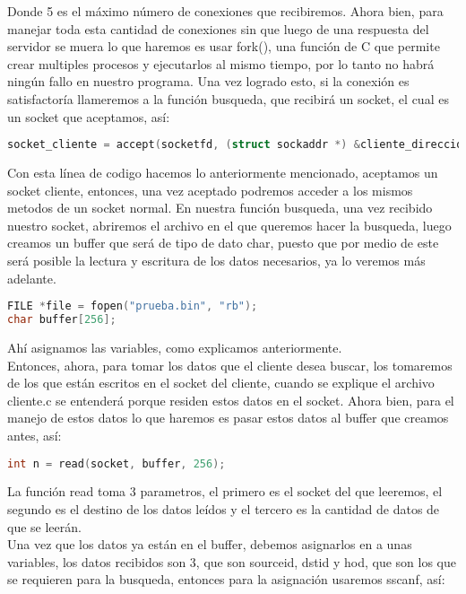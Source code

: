 \documentclass{article}
\begin{document}
Donde 5 es el máximo número de conexiones que recibiremos.
Ahora bien, para manejar toda esta cantidad de conexiones sin que luego de una respuesta del servidor se muera lo que haremos es usar fork()\cite{man7fork}, una función de C que permite crear multiples procesos y ejecutarlos al mismo tiempo, por lo tanto no habrá ningún fallo en nuestro programa.
Una vez logrado esto, si la conexión es satisfactoría llameremos a la función busqueda, que recibirá un socket, el cual es un socket que aceptamos, así:
\begin{lstlisting}[language=C]
socket_cliente = accept(socketfd, (struct sockaddr *) &cliente_direccion, &tamano_cliente);
\end{lstlisting}
Con esta línea de codigo hacemos lo anteriormente mencionado, aceptamos\cite{man7accept} un socket cliente, entonces, una vez aceptado podremos acceder a los mismos metodos de un socket normal.
En nuestra función busqueda, una vez recibido nuestro socket, abriremos el archivo en el que queremos hacer la busqueda, luego creamos un buffer que será de tipo de dato char, puesto que por medio de este será posible la lectura y escritura de los datos necesarios, ya lo veremos más adelante.


\begin{lstlisting}[language=C]
FILE *file = fopen("prueba.bin", "rb");
char buffer[256];
\end{lstlisting}


Ahí asignamos las variables, como explicamos anteriormente.\\ 
Entonces, ahora, para tomar los datos que el cliente desea buscar, los tomaremos de los que están escritos en el socket del cliente, cuando se explique el archivo cliente.c se entenderá porque residen estos datos en el socket. Ahora bien, para el manejo de estos datos lo que haremos es pasar estos datos al buffer que creamos antes, así:


\begin{lstlisting}[language=C]
int n = read(socket, buffer, 256);
\end{lstlisting}

La función read\cite{man7read} toma 3 parametros, el primero es el socket del que leeremos, el segundo es el destino de los datos leídos y el tercero es la cantidad de datos de que se leerán.\\ 
Una vez que los datos ya están en el buffer, debemos asignarlos en a unas variables, los datos recibidos son 3, que son sourceid, dstid y hod, que son los que se requieren para la busqueda, entonces para la asignación usaremos sscanf\cite{man7sscanf}, así:
\end{document}
